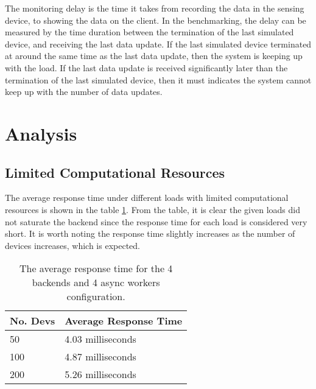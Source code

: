 \documentclass[../thesis.tex]{subfiles}
\begin{document}
The monitoring delay is the time it takes from recording the data in the sensing device, to showing the data on the client. In the benchmarking, the delay can be measured by the time duration between the termination of the last simulated device, and receiving the last data update. If the last simulated device terminated at around the same time as the last data update, then the system is keeping up with the load. If the last data update is received significantly later than the termination of the last simulated device, then it must indicates the system cannot keep up with the number of data updates. 

\section{Analysis}

\subsection{Limited Computational Resources}

The average response time under different loads with limited computational resources is shown in the table \ref{tab:avg4-4}. From the table, it is clear the given loads did not saturate the backend since the response time for each load is considered very short. It is worth noting the response time slightly increases as the number of devices increases, which is expected.

\begin{table}[h!]
	\begin{center}
		\caption{The average response time for the 4 backends and 4 async workers configuration.}
		\label{tab:avg4-4}
		\begin{tabular}{l|l}
			\toprule
			\textbf{No. Devs} & \textbf{Average Response Time}\\
			\midrule
			50 & 4.03 milliseconds\\
			100 & 4.87 milliseconds\\
			200 & 5.26 milliseconds\\
			\bottomrule
		\end{tabular}
	\end{center}
\end{table}
\end{document}
